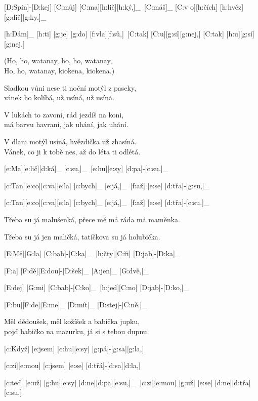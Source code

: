 


[D:Spin]-[D:kej] [C:můj] [C:ma][h:lič][h:ký,]_\
[C:máš]_ [C:v o][h:čích] [h:hvěz][g:dič][g:ky.]_\

[h:Dám]_ [h:ti] [g:je] [g:do] [f:vla][f:sů,]\
[C:tak] [C:u][g:sí][g:nej,] [C:tak] [h:u][g:sí][g:nej.]\

(Ho, ho, watanay, ho, ho, watanay,\\
Ho, ho, watanay, kiokena, kiokena.)

Sladkou vůni nese ti noční motýl z paseky,\\
vánek ho kolíbá, už usíná, už usíná.

V lukách to zavoní, rád jezdíš na koni,\\
má barvu havraní, jak uhání, jak uhání.

V dlani motýl usíná, hvězdička už zhasíná.\\
Vánek, co ji k tobě nes, až do léta ti odlétá.



[e:Ma][e:lič][d:ká]_ [c:su,]_\
[e:hu][e:sy] [d:pa]-[c:su.]_\

[c:Tan][e:co][c:va][e:la] [c:bych]_ [e:já,]_\
[f:až] [e:se] [d:třa]-[g:su,]_\

[c:Tan][e:co][c:va][e:la] [c:bych]_ [e:já,]_\
[f:až] [e:se] [d:třa]-[c:su.]_\

Třeba su já malušenká, přece mě má ráda má maměnka.

Třeba su já jen maličká, tatíčkova su já holubička.


\pis{Mazurka}{h}{A}

[E:Mě][G:la] [C:bab]-[C:ka]_\
[h:čty][C:ři] [D:jab]-[D:ka]_\

[F:a] [F:dě][E:dou]-[D:šek]_ [A:jen]_ [G:dvě,]_\

[E:dej] [G:mi] [C:bab]-[C:ko]_\
[h:jed][C:no] [D:jab]-[D:ko,]_\

[F:bu][F:de][E:me]_ [D:mít]_ [D:stej]-[C:ně.]_\

Měl dědoušek, měl kožíšek a babička jupku,\\
pojď babičko na mazurku, já si s tebou dupnu.



[c:Když] [e:jsem] [c:hu][e:sy] [g:pá]-[g:sa][g:la,]\

[c:zi][e:mou] [c:jsem] [e:se] [d:třá]-[d:sa][d:la,]\

[c:teď] [e:už] [g:hu][e:sy] [d:ne][d:pa][e:su,]_\
[c:zi][e:mou] [g:už] [e:se] [d:ne][d:třa][c:su.]\


